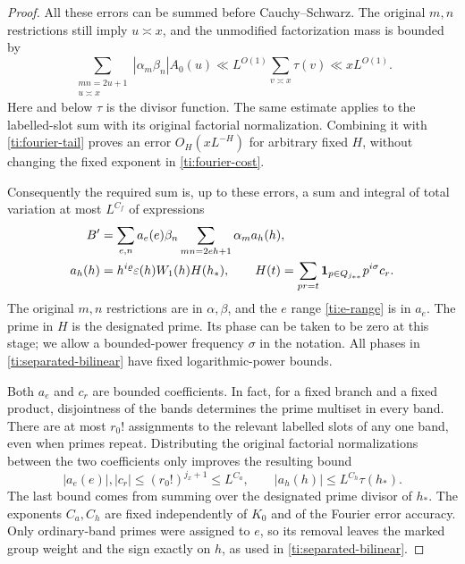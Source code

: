 \begin{proof}
All these errors can be summed before Cauchy--Schwarz. The original
$m,n$ restrictions still imply $u\asymp x$, and the unmodified
factorization mass is bounded by
\[
 \sum_{\substack{mn=2u+1\\u\asymp x}}
       |\alpha_m\beta_n|A_0(u)
       \ll L^{O(1)}\sum_{v\asymp x}\tau(v)
       \ll xL^{O(1)}.
\]
Here and below $\tau$ is the divisor function. The same estimate
applies to the labelled-slot sum with its original factorial
normalization. Combining it with \eqref{ti:fourier-tail} proves an
error $O_H(xL^{-H})$ for arbitrary fixed $H$, without changing the
fixed exponent in \eqref{ti:fourier-cost}.

Consequently the required sum is, up to these errors, a sum and
integral of total variation at most $L^{C_f}$ of expressions
\begin{equation}\label{ti:separated-bilinear}
 \begin{split}
 B'&=\sum_{e,n}a_e(e)\beta_n
                  \sum_{mn=2eh+1}\alpha_m a_h(h),\\
 a_h(h)&=h^{i\varrho}\varepsilon(h)W_1(h)H(h_*),\qquad
 H(t)=\sum_{pr=t}\mathbf{1}_{p\in Q_{j_{**}}}p^{i\sigma}c_r.
 \end{split}
\end{equation}
The original $m,n$ restrictions are in $\alpha,\beta$, and the
$e$ range \eqref{ti:e-range} is in $a_e$. The prime in $H$ is the
designated prime. Its phase can be taken to be zero at this stage;
we allow a bounded-power frequency $\sigma$ in the notation. All
phases in \eqref{ti:separated-bilinear} have fixed logarithmic-power
bounds.

Both $a_e$ and $c_r$ are bounded coefficients. In fact, for a fixed
branch and a fixed product, disjointness of the bands determines the
prime multiset in every band. There are at most $r_0!$ assignments to
the relevant labelled slots of any one band, even when primes repeat.
Distributing the original factorial normalizations between the two
coefficients only improves the resulting bound
\begin{equation}\label{ti:coefficient-bounds}
 |a_e(e)|,|c_r|\le(r_0!)^{j_x+1}\le L^{C_a},
 \qquad |a_h(h)|\le L^{C_h}\tau(h_*).
\end{equation}
The last bound comes from summing over the designated prime divisor
of $h_*$. The exponents $C_a,C_h$ are fixed independently of $K_0$
and of the Fourier error accuracy. Only ordinary-band primes were
assigned to $e$, so its removal leaves the marked group weight and
the sign exactly on $h$, as used in \eqref{ti:separated-bilinear}.


\end{proof}
